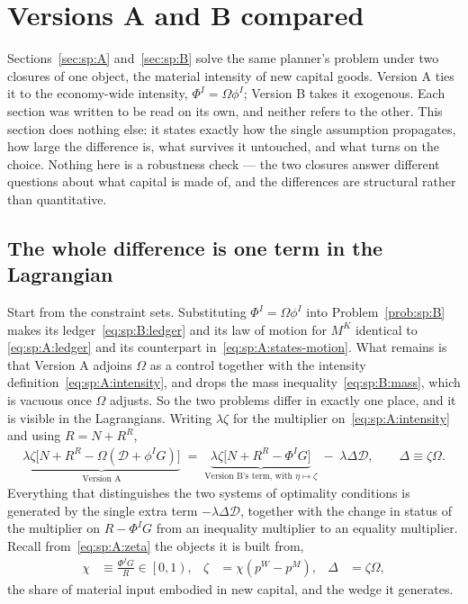 \section{Versions A and B compared}\label{sec:sp:compare}\label{sec:sp:B:compare}

Sections~\ref{sec:sp:A} and~\ref{sec:sp:B} solve the same planner's problem under two closures of one
object, the material intensity of new capital goods. Version A ties it to the economy-wide intensity,
$\Phi^I=\Omega\phi^I$; Version B takes it exogenous. Each section was written to be read on its own,
and neither refers to the other. This section does nothing else: it states exactly how the single
assumption propagates, how large the difference is, what survives it untouched, and what turns on the
choice. Nothing here is a robustness check --- the two closures answer different questions about what
capital is made of, and the differences are structural rather than quantitative.


\subsection{The whole difference is one term in the Lagrangian}\label{sec:sp:compare:map}

Start from the constraint sets. Substituting $\Phi^I=\Omega\phi^I$ into Problem~\ref{prob:sp:B} makes
its ledger~\eqref{eq:sp:B:ledger} and its law of motion for $M^K$ identical to
\eqref{eq:sp:A:ledger} and its counterpart in~\eqref{eq:sp:A:states-motion}. What remains is that
Version A adjoins $\Omega$ as a control together with the intensity
definition~\eqref{eq:sp:A:intensity}, and drops the mass inequality~\eqref{eq:sp:B:mass}, which is
vacuous once $\Omega$ adjusts. So the two problems differ in exactly one place, and it is visible in
the Lagrangians. Writing $\lambda\zeta$ for the multiplier on~\eqref{eq:sp:A:intensity} and using
$R=N+R^R$,
\begin{align}
\underbrace{\lambda\zeta\Big[N+R^R-\Omega\left(\mathcal D+\phi^IG\right)\Big]}_{\text{Version A}}
\;=\;
\underbrace{\lambda\zeta\Big[N+R^R-\Phi^IG\Big]}_{\text{Version B's term, with }\eta\mapsto\zeta}
\;-\;\lambda\Delta\mathcal D,
\qquad
\Delta\equiv\zeta\Omega .
\label{eq:sp:compare:lagdiff}
\end{align}
Everything that distinguishes the two systems of optimality conditions is generated by the single
extra term $-\lambda\Delta\mathcal D$, together with the change in status of the multiplier on
$R-\Phi^IG$ from an inequality multiplier to an equality multiplier. Recall from~\eqref{eq:sp:A:zeta}
the objects it is built from,
\begin{align}
\chi &\equiv \frac{\Phi^IG}{R}\in\left[0,1\right),
&
\zeta &= \chi\left(p^W-p^M\right),
&
\Delta &= \zeta\Omega ,
\label{eq:sp:B:compare:Delta}
\end{align}
the share of material input embodied in new capital, and the wedge it generates.


